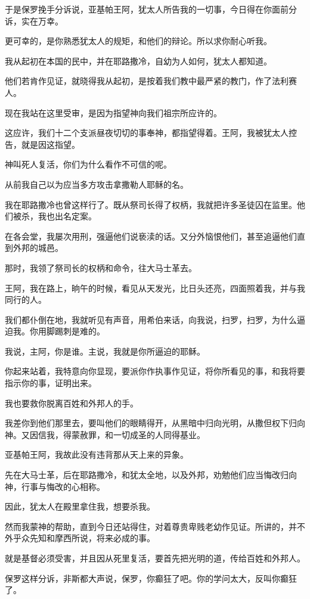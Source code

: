 \documentclass[12pt,oneside]{book}
\begin{document}
于是保罗挽手分诉说，亚基帕王阿，犹太人所告我的一切事，今日得在你面前分诉，实在万幸。

更可幸的，是你熟悉犹太人的规矩，和他们的辩论。所以求你耐心听我。

我从起初在本国的民中，并在耶路撒冷，自幼为人如何，犹太人都知道。

他们若肯作见证，就晓得我从起初，是按着我们教中最严紧的教门，作了法利赛人。

现在我站在这里受审，是因为指望神向我们祖宗所应许的。

这应许，我们十二个支派昼夜切切的事奉神，都指望得着。王阿，我被犹太人控告，就是因这指望。

神叫死人复活，你们为什么看作不可信的呢。

从前我自己以为应当多方攻击拿撒勒人耶稣的名。

我在耶路撒冷也曾这样行了。既从祭司长得了权柄，我就把许多圣徒囚在监里。他们被杀，我也出名定案。

在各会堂，我屡次用刑，强逼他们说亵渎的话。又分外恼恨他们，甚至追逼他们直到外邦的城邑。

那时，我领了祭司长的权柄和命令，往大马士革去。

王阿，我在路上，晌午的时候，看见从天发光，比日头还亮，四面照着我，并与我同行的人。

我们都仆倒在地，我就听见有声音，用希伯来话，向我说，扫罗，扫罗，为什么逼迫我。你用脚踢刺是难的。

我说，主阿，你是谁。主说，我就是你所逼迫的耶稣。

你起来站着，我特意向你显现，要派你作执事作见证，将你所看见的事，和我将要指示你的事，证明出来。

我也要救你脱离百姓和外邦人的手。

我差你到他们那里去，要叫他们的眼睛得开，从黑暗中归向光明，从撒但权下归向神。又因信我，得蒙赦罪，和一切成圣的人同得基业。

亚基帕王阿，我故此没有违背那从天上来的异象。

先在大马士革，后在耶路撒冷，和犹太全地，以及外邦，劝勉他们应当悔改归向神，行事与悔改的心相称。

因此，犹太人在殿里拿住我，想要杀我。

然而我蒙神的帮助，直到今日还站得住，对着尊贵卑贱老幼作见证。所讲的，并不外乎众先知和摩西所说，将来必成的事。

就是基督必须受害，并且因从死里复活，要首先把光明的道，传给百姓和外邦人。

保罗这样分诉，非斯都大声说，保罗，你癫狂了吧。你的学问太大，反叫你癫狂了。
\end{document}
